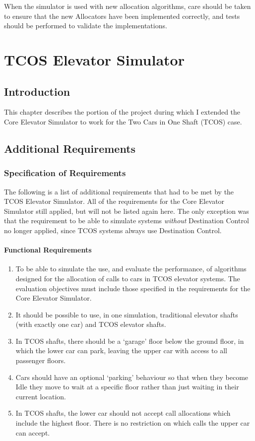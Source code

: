 \documentclass{UoYCSproject}
\begin{document}
When the simulator is used with new allocation algorithms, care should be taken to ensure that the new Allocators have been implemented correctly, and tests should be performed to validate the implementations.

\chapter{TCOS Elevator Simulator}
\label{teschapter}

\section{Introduction}

This chapter describes the portion of the project during which I extended the Core Elevator Simulator to work for the Two Cars in One Shaft (TCOS) case.

\section{Additional Requirements}

\subsection{Specification of Requirements}

The following is a list of additional requirements that had to be met by the TCOS Elevator Simulator.  All of the requirements for the Core Elevator Simulator still applied, but will not be listed again here.  The only exception was that the requirement to be able to simulate systems \textit{without} Destination Control no longer applied, since TCOS systems always use Destination Control.

\subsubsection{Functional Requirements}

	\begin{enumerate}
		\item To be able to simulate the use, and evaluate the performance, of algorithms designed for the allocation of calls to cars in TCOS elevator systems.  The evaluation objectives must include those specified in the requirements for the Core Elevator Simulator.
		\item It should be possible to use, in one simulation, traditional elevator shafts (with exactly one car) and TCOS elevator shafts.
		\item In TCOS shafts, there should be a `garage' floor below the ground floor, in which the lower car can park, leaving the upper car with access to all passenger floors.
		\item Cars should have an optional `parking' behaviour so that when they become Idle they move to wait at a specific floor rather than just waiting in their current location.
		\item In TCOS shafts, the lower car should not accept call allocations which include the highest floor.  There is no restriction on which calls the upper car can accept.
	\end{enumerate}
\end{document}
